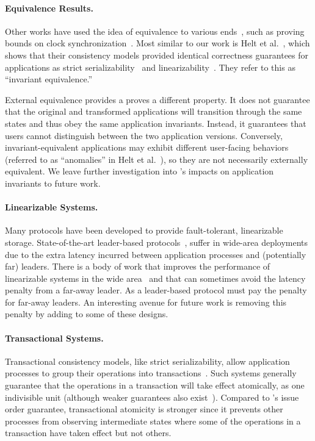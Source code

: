 \paragraph{Equivalence Results.}
Other works have used the idea of equivalence to various
ends~\cite{goldman1993unifiedModel,lundelius1984clocksync,
fischer1985flp,attiya1993seqlin},
such as proving bounds on clock
synchronization~\cite{lundelius1984clocksync}.
Most similar to our work is Helt et al.~\cite{helt2021rss}, which shows that their consistency
models provided identical correctness guarantees for applications
as strict serializability~\cite{papadimitriou1979serializability} and linearizability~\cite{herlihy1990linearizability}.
They refer to this as ``invariant equivalence.'' 

External equivalence provides a proves a different property.
It does not guarantee that the original and transformed applications
will transition through the same states and thus obey the same
application invariants. Instead, it guarantees that users cannot distinguish between the two
application versions.
Conversely, invariant-equivalent applications may exhibit different
user-facing behaviors (referred to as ``anomalies'' in Helt et
al.~\cite{helt2021rss}), so they are not necessarily externally equivalent.
We leave further investigation into
\MDL{}'s impacts on application invariants to future work.

\paragraph{Linearizable Systems.} Many protocols have been developed to provide fault-tolerant, linearizable storage.
State-of-the-art leader-based
protocols~\cite{ongaro2014raft,lamport1998paxos,oki1988vr},
suffer in wide-area deployments due to the extra
latency incurred between application processes and (potentially far)
leaders.
There is a body of work that improves the performance of
linearizable systems in the wide
area~\cite{mao2008mencius,moraru2013epaxos,burke2020gryff} and that can sometimes avoid the latency penalty from a far-away leader.
As a leader-based protocol \sys{} must pay the penalty for far-away leaders.
An interesting avenue for future work is removing this penalty by adding \mdl{} to some of these designs.

\paragraph{Transactional Systems.}
Transactional consistency models, like strict serializability,
allow application processes to group their operations into
transactions~\cite{papadimitriou1979serializability}. Such
systems generally guarantee that the operations in a transaction
will take effect atomically, as one indivisible unit (although weaker 
guarantees also exist~\cite{adya1999weakcons}).
Compared to \MDL{}'s issue order guarantee, transactional atomicity 
is stronger since it prevents other processes from observing 
intermediate states where some of the operations in a transaction 
have taken effect but not others. 

